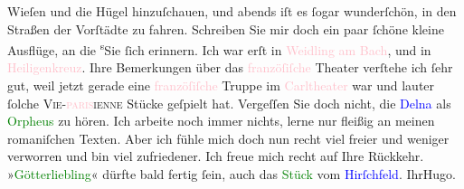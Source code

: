                     Wieſen und die Hügel hinzuſchauen, und abends iſt es ſogar wunderſchön, in den
                    Straßen der Vorſtädte zu fahren.\pend
           \pstart
           Schreiben Sie mir doch ein paar ſchöne kleine Ausflüge, an die \substVorne{}\textsuperscript{s}\substDazwischen{}S\substHinten{}ie ſich erinnern. Ich war erſt in \textcolor{pink}{Weidling
                        am Bach}{}\ledrightnote{\textcolor{pink}{Weidlingbach}}, und in \textcolor{pink}{Heiligenkreuz}{}\ledrightnote{\textcolor{pink}{Heiligenkreuz}}.\pend
           \pstart
           Ihre Bemerkungen über das \textcolor{pink}{franzöſiſche}{}\ledrightnote{\textcolor{pink}{Frankreich}} Theater
                    verſtehe ich ſehr gut, weil jetzt gerade {\pb}eine \textcolor{pink}{franzöſiſche}{}\ledrightnote{\textcolor{pink}{Frankreich}} Truppe im \textcolor{pink}{Carltheater}{}\ledrightnote{\textcolor{pink}{Carl-Theater}} war und lauter ſolche \textsc{Vie-\textcolor{pink}{paris}{}\ledrightnote{\textcolor{pink}{Paris}}ienne}{ }Stücke geſpielt hat. Vergeſſen Sie doch nicht,
                    die \textcolor{blue}{Delna}{}\ledrightnote{\textcolor{blue}{Marie Delna}} als \textcolor{green}{Orpheus}{} zu hören.\pend
           \pstart
           Ich arbeite noch immer nichts, lerne nur fleißig an meinen romaniſchen Texten.
                    Aber ich fühle mich doch nun recht viel freier und weniger verworren und bin
                    viel zufriedener.\pend
           \pstart
           Ich freue mich recht auf Ihre Rückkehr. »\textcolor{green}{Götterliebling}{}\ledrightnote{\textcolor{green}{Der Tod Georgs}}« dürfte bald fertig ſein, auch das \textcolor{green}{Stück}{} vom \textcolor{blue}{Hirſchfeld}{}\ledrightnote{\textcolor{blue}{Georg Hirschfeld}}.\pend
           \pstart Ihr\spacefill\mbox{Hugo.}\pend{}\endnumbering{}  
      